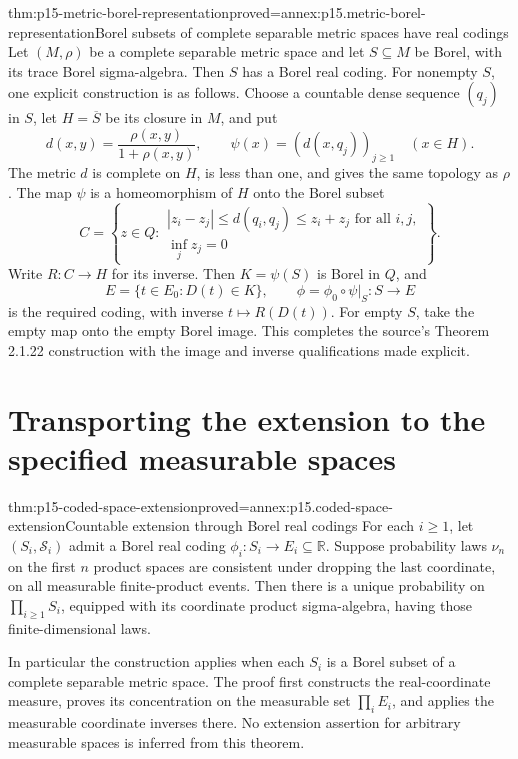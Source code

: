 \begin{hbtheorem}{thm:p15-metric-borel-representation}{proved=annex:p15.metric-borel-representation}{Borel subsets of complete separable metric spaces have real codings}
Let \((M,\rho)\) be a complete separable metric space and let
\(S\subseteq M\) be Borel, with its trace Borel sigma-algebra.
Then \(S\) has a Borel real coding. For nonempty \(S\), one
explicit construction is as follows. Choose a countable dense sequence
\((q_j)\) in \(S\), let \(H=\overline S\) be its closure in \(M\), and put
\[
 d(x,y)=\frac{\rho(x,y)}{1+\rho(x,y)},\qquad
 \psi(x)=(d(x,q_j))_{j\geq1}\quad(x\in H).
\]
The metric \(d\) is complete on \(H\), is less than one,
and gives the same topology as \(\rho\). The map \(\psi\)
is a homeomorphism of \(H\) onto the Borel subset
\[
 C=\left\{z\in Q:
 \begin{array}{l}
 |z_i-z_j|\leq d(q_i,q_j)\leq z_i+z_j\text{ for all }i,j,\\
 \inf_j z_j=0
 \end{array}\right\}.
\]
Write \(R:C\to H\) for its inverse. Then \(K=\psi(S)\)
is Borel in \(Q\), and
\[
 E=\{t\in E_0:D(t)\in K\},\qquad
 \phi=\phi_0\circ\psi|_S:S\longrightarrow E
\]
is the required coding, with inverse \(t\mapsto R(D(t))\).
For empty \(S\), take the empty map onto the empty Borel image.
This completes the source's Theorem 2.1.22 construction with the
image and inverse qualifications made explicit.
\end{hbtheorem}

\section{Transporting the extension to the specified measurable spaces}
\label{sec:p15-coded-space-extension}

\begin{hbtheorem}{thm:p15-coded-space-extension}{proved=annex:p15.coded-space-extension}{Countable extension through Borel real codings}
For each \(i\geq1\), let \((S_i,\mathcal S_i)\) admit a
Borel real coding \(\phi_i:S_i\to E_i\subseteq\mathbb R\).
Suppose probability laws \(\nu_n\) on the first \(n\) product
spaces are consistent under dropping the last coordinate, on all
measurable finite-product events. Then there is a unique probability
on \(\prod_{i\geq1}S_i\), equipped with its coordinate product
sigma-algebra, having those finite-dimensional laws.

In particular the construction applies when each \(S_i\) is a
Borel subset of a complete separable metric space. The proof first
constructs the real-coordinate measure, proves its concentration on
the measurable set \(\prod_i E_i\), and applies the measurable
coordinate inverses there. No extension assertion for arbitrary
measurable spaces is inferred from this theorem.
\end{hbtheorem}

